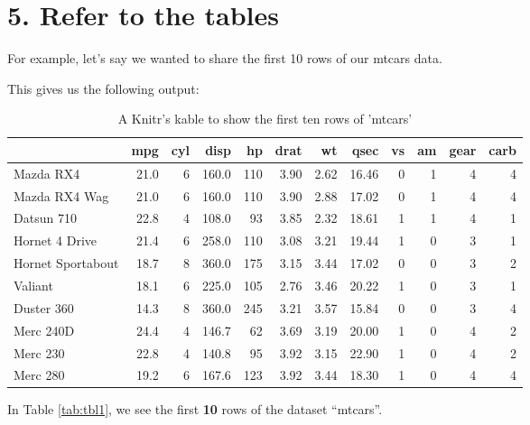\documentclass[
]{article}
\begin{document}
\section{5. Refer to the tables}\label{refer-to-the-tables}

For example, let's say we wanted to share the first 10 rows of our
mtcars data.

This gives us the following output:

\begin{longtable}[t]{lrrrrrrrrrrr}
\caption{\label{tab:tabl1}A Knitr's kable to show the first ten rows of 'mtcars'}\\
\toprule
 & mpg & cyl & disp & hp & drat & wt & qsec & vs & am & gear & carb\\
\midrule
Mazda RX4 & 21.0 & 6 & 160.0 & 110 & 3.90 & 2.62 & 16.46 & 0 & 1 & 4 & 4\\
Mazda RX4 Wag & 21.0 & 6 & 160.0 & 110 & 3.90 & 2.88 & 17.02 & 0 & 1 & 4 & 4\\
Datsun 710 & 22.8 & 4 & 108.0 & 93 & 3.85 & 2.32 & 18.61 & 1 & 1 & 4 & 1\\
Hornet 4 Drive & 21.4 & 6 & 258.0 & 110 & 3.08 & 3.21 & 19.44 & 1 & 0 & 3 & 1\\
Hornet Sportabout & 18.7 & 8 & 360.0 & 175 & 3.15 & 3.44 & 17.02 & 0 & 0 & 3 & 2\\
\addlinespace
Valiant & 18.1 & 6 & 225.0 & 105 & 2.76 & 3.46 & 20.22 & 1 & 0 & 3 & 1\\
Duster 360 & 14.3 & 8 & 360.0 & 245 & 3.21 & 3.57 & 15.84 & 0 & 0 & 3 & 4\\
Merc 240D & 24.4 & 4 & 146.7 & 62 & 3.69 & 3.19 & 20.00 & 1 & 0 & 4 & 2\\
Merc 230 & 22.8 & 4 & 140.8 & 95 & 3.92 & 3.15 & 22.90 & 1 & 0 & 4 & 2\\
Merc 280 & 19.2 & 6 & 167.6 & 123 & 3.92 & 3.44 & 18.30 & 1 & 0 & 4 & 4\\
\bottomrule
\end{longtable}

In Table \ref{tab:tbl1}, we see the first \textbf{10} rows of the
dataset ``mtcars''.
\end{document}
